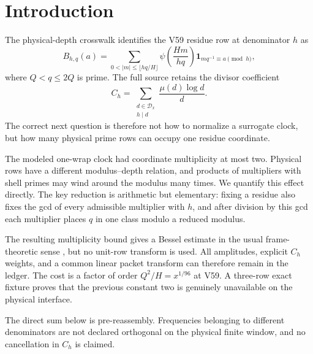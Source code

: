 \section{Introduction}

The physical-depth crosswalk identifies the V59 residue row at denominator $h$ as
\begin{equation}
 B_{h,q}(a)=
 \sum_{0<|m|\le\lfloor hq/H\rfloor}
 \psi\!\left(\frac{Hm}{hq}\right)
 \mathbf 1_{m q^{-1}\equiv a\pmod h},                 \label{eq:physical-row}
\end{equation}
where $Q<q\le2Q$ is prime.  The full source retains the divisor coefficient
\[
 C_h=\sum_{\substack{d\in\mathcal D_x\\h\mid d}}
 \frac{\mu(d)\log d}{d}.
\]
The correct next question is therefore not how to normalize a surrogate clock, but how
many physical prime rows can occupy one residue coordinate.

The modeled one-wrap clock had coordinate multiplicity at most two.  Physical rows
have a different modulus--depth relation, and products of multipliers with shell primes
may wind around the modulus many times.  We quantify this effect directly.  The key
reduction is arithmetic but elementary: fixing a residue also fixes the gcd of every
admissible multiplier with $h$, and after division by this gcd each multiplier places
$q$ in one class modulo a reduced modulus.

The resulting multiplicity bound gives a Bessel estimate in the usual frame-theoretic
sense \citep{christensen2016}, but no unit-row transform is used.  All amplitudes,
explicit $C_h$ weights, and a common linear packet transform can therefore remain in
the ledger.  The cost is a factor of order $Q^2/H=x^{1/96}$ at V59.  A three-row exact
fixture proves that the previous constant two is genuinely unavailable on the
physical interface.

The direct sum below is pre-reassembly.  Frequencies belonging to different
denominators are not declared orthogonal on the physical finite window, and no
cancellation in $C_h$ is claimed.

